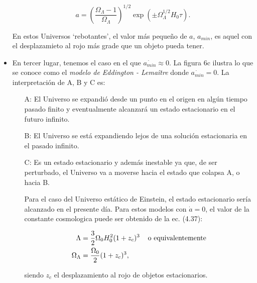 \documentclass[11pt]{article}
\begin{document}
\begin{itemize}
            \begin{equation}
                a = \left(\frac{\Omega_{\Lambda} - 1}{\Omega_{\Lambda}} \right)^{1/2} \exp (\pm \Omega_{\Lambda}^{1/2} H_0 \tau).
            \end{equation}
            
            En estos Universos `rebotantes', el valor más pequeño de $a$, $a_{min}$, es aquel con el desplazamieto al rojo más grade que un objeto pueda tener. 
       
       \item En tercer lugar, tenemos el caso en el que $\dot{a_{min}} \approx 0$. La figura 6c ilustra lo que se conoce como el {\textit{modelo de Eddington - Lema\^itre}} donde $\dot{a_{min}} = 0$. La interpretación de A, B y C es:
       
       \begin{itemize}
           \item[A:] El Universo se expandió desde un punto en el origen en algún tiempo pasado finito y eventualmente alcanzará un estado estacionario en el futuro infinito. 
           \item[B:] El Universo se está expandiendo lejos de una solución estacionaria en el pasado infinito. 
           \item[C:] Es un estado estacionario y además inestable ya que, de ser perturbado, el Universo va a moverse hacia el estado que colapsa A, o hacia B. 
           
           Para el caso del Universo estático de Einstein, el estado estacionario sería alcanzado en el presente día. Para estos modelos con $\dot{a} = 0$, el valor de la constante cosmologica puede ser obtenido de la ec. (4.37):
           
           \begin{align}
               \Lambda & = \frac{3}{2} \Omega_0 H_0^2 (1 + z_c)^3 \hspace{0.4cm} \text{o equivalentemente} \\
               \Omega_{\Lambda} & = \frac{\Omega_0}{2} (1 + z_c)^3,
           \end{align}
           
           siendo $z_c$ el desplazamiento al rojo de objetos estacionarios. 
       \end{itemize}
       
       
    \end{itemize}
    
    
    
\end{document}
